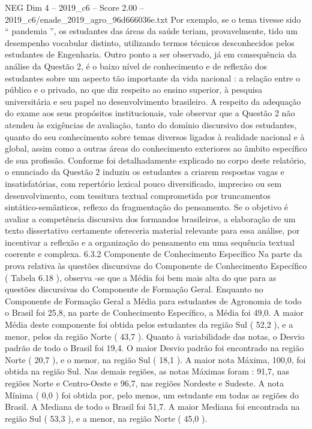 \begin{textsample}{NEG Dim 4 – 2019\_c6 – Score 2.00 – 2019\_c6/enade\_2019\_agro\_96d666036e.txt}
Por exemplo, se o tema tivesse sido “ pandemia ”, os estudantes das áreas da saúde teriam, provavelmente, tido um desempenho vocabular distinto, utilizando termos técnicos desconhecidos pelos estudantes de Engenharia.
Outro ponto a ser observado, já em consequência da análise da Questão 2, é o baixo nível de conhecimento e de reflexão dos estudantes sobre um aspecto tão importante da vida nacional : a relação entre o público e o privado, no que diz respeito ao ensino superior, à pesquisa universitária e seu papel no desenvolvimento brasileiro.
A respeito da adequação do exame aos seus propósitos institucionais, vale observar que a Questão 2 não atendeu às exigências de avaliação, tanto do domínio discursivo dos estudantes, quanto do seu conhecimento sobre temas diversos ligados à realidade nacional e à global, assim como a outras áreas do conhecimento exteriores ao âmbito específico de sua profissão.
Conforme foi detalhadamente explicado no corpo deste relatório, o enunciado da Questão 2 induziu os estudantes a criarem respostas vagas e insatisfatórias, com repertório lexical pouco diversificado, impreciso ou sem desenvolvimento, com tessitura textual comprometida por truncamentos sintático-semânticos, reflexo da fragmentação do pensamento.
Se o objetivo é avaliar a competência discursiva dos formandos brasileiros, a elaboração de um texto dissertativo certamente ofereceria material relevante para essa análise, por incentivar a reflexão e a organização do pensamento em uma sequência textual coerente e complexa. 6.3.2 Componente de Conhecimento Específico Na parte da prova relativa às questões discursivas do Componente de Conhecimento Específico ( Tabela 6.18 ), observa -se que a Média foi bem mais alta do que para as questões discursivas do Componente de Formação Geral.
Enquanto no Componente de Formação Geral a Média para estudantes de Agronomia de todo o Brasil foi 25,8, na parte de Conhecimento Específico, a Média foi 49,0.
A maior Média deste componente foi obtida pelos estudantes da região Sul ( 52,2 ), e a menor, pelos da região Norte ( 43,7 ).
Quanto à variabilidade das notas, o Desvio padrão de todo o Brasil foi 19,4.
O maior Desvio padrão foi encontrado na região Norte ( 20,7 ), e o menor, na região Sul ( 18,1 ).
A maior nota Máxima, 100,0, foi obtida na região Sul.
Nas demais regiões, as notas Máximas foram : 91,7, nas regiões Norte e Centro-Oeste e 96,7, nas regiões Nordeste e Sudeste.
A nota Mínima ( 0,0 ) foi obtida por, pelo menos, um estudante em todas as regiões do Brasil.
A Mediana de todo o Brasil foi 51,7.
A maior Mediana foi encontrada na região Sul ( 53,3 ), e a menor, na região Norte ( 45,0 ).

\end{textsample}
